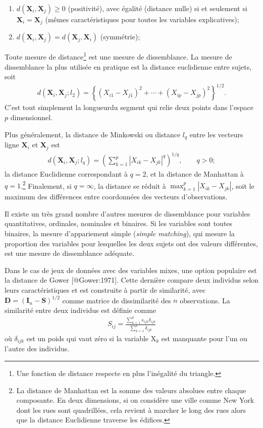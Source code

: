 \documentclass[
  11pt,
  letterpaper,
]{scrbook}
\providecommand{\tightlist}{%
  \setlength{\itemsep}{0pt}\setlength{\parskip}{0pt}}\usepackage{longtable,booktabs,array}
\theoremstyle{definition}
\theoremstyle{remark}
\begin{document}
\begin{enumerate}
\def\labelenumi{\arabic{enumi})}
\tightlist
\item
  \(d(\mathbf{X}_i, \mathbf{X}_j) \geq 0\) (positivité), avec égalité
  (distance nulle) si et seulement si \(\mathbf{X}_i=\mathbf{X}_j\)
  (mêmes caractéristiques pour toutes les variables explicatives);
\item
  \(d(\mathbf{X}_i, \mathbf{X}_j)=d(\mathbf{X}_j, \mathbf{X}_i)\)
  (symmétrie);
\end{enumerate}

Toute mesure de distance\footnote{Une fonction de distance respecte en
  plus l'inégalité du triangle.} est une mesure de dissemblance. La
mesure de dissemblance la plus utilisée en pratique est la distance
euclidienne entre sujets, soit \begin{align*}
d(\mathbf{X}_i, \mathbf{X}_j; l_2) = \left\{(X_{i1}-X_{j1})^2 + \cdots + (X_{ip}-X_{jp})^2\right\}^{1/2}.
\end{align*} C'est tout simplement la longueurdu segment qui relie deux
points dans l'espace \(p\) dimensionnel.

Plus généralement, la distance de Minkowski ou distance \(l_q\) entre
les vecteurs ligne \(\mathbf{X}_i\) et \(\mathbf{X}_j\) est
\begin{align*}
d(\mathbf{X}_i, \mathbf{X}_j; l_q) = \left( \sum_{k=1}^p |X_{ik}-X_{jk}|^q \right)^{1/q},\qquad q > 0;
\end{align*} la distance Euclidienne correspondant à \(q=2\), et la
distance de Manhattan à \(q=1\).\footnote{La distance de Manhattan est
  la somme des valeurs absolues entre chaque composante. En deux
  dimensions, si on considère une ville comme New York dont les rues
  sont quadrillées, cela revient à marcher le long des rues alors que la
  distance Euclidienne traverse les édifices.} Finalement, si
\(q=\infty\), la distance se réduit à \(\max_{k=1}^p |X_{ik}-X_{jk}|\),
soit le maximum des différences entre coordonnées des vecteurs
d'observations.

Il existe un très grand nombre d'autres mesures de dissemblance pour
variables quantitatives, ordinales, nominales et binaires. Si les
variables sont toutes binaires, la mesure d'appariement simple
(\emph{simple matching}), qui mesure la proportion des variables pour
lesquelles les deux sujets ont des valeurs différentes, est une mesure
de dissemblance adéquate.

Dans le cas de jeux de données avec des variables mixes, une option
populaire est la distance de Gower {[}@Gower:1971{]}. Cette dernière
compare deux individus selon leurs caractéristiques et est construite à
partir de similarité, avec
\(\mathbf{D} = (\mathbf{I}_n-\mathbf{S})^{1/2}\) comme matrice de
dissimilarité des \(n\) observations. La similarité entre deux individus
est définie comme \begin{align*}
S_{ij} = \frac{\sum_{k=1}^p s_{ijk} \delta_{ijk}}{\sum_{k=1}^p \delta_{ijk}}
\end{align*} où \(\delta_{ijk}\) est un poids qui vaut zéro si la
variable \(\mathrm{X}_k\) est manquante pour l'un ou l'autre des
individus.
\end{document}
